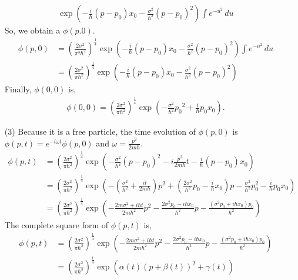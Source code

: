 \documentclass[floatfix,nofootinbib,superscriptaddress,fleqn]{revtex4}
\begin{document}
\begin{itemize}
\begin{align}
    \exp\left( -\frac{i}{\hbar}(p-p_0)x_0-\frac{\sigma^2}{\hbar^2}(p-p_0)^2 \right)
    \int e^{-u^2}\,du
  \end{align}
  So, we obtain a $\phi(p.0)$.
  \begin{align}
    \phi(p,0) &= {\left(\frac{2\sigma^2}{\pi^3\hbar^2}\right)}^{\frac{1}{4}}
    \exp\left( -\frac{i}{\hbar}(p-p_0)x_0-\frac{\sigma^2}{\hbar^2}(p-p_0)^2 \right)
    \int e^{-u^2}\,du \\
    &= {\left(\frac{2\sigma^2}{\pi\hbar^2}\right)}^{\frac{1}{4}}
    \exp\left( -\frac{i}{\hbar}(p-p_0)x_0-\frac{\sigma^2}{\hbar^2}(p-p_0)^2 \right)
  \end{align}
  Finally, $\phi(0,0)$ is,
  \begin{align}
    \phi(0,0) = {\left(\frac{2\sigma^2}{\pi\hbar^2}\right)}^{\frac{1}{4}}
    \exp\left(-\frac{\sigma^2}{\hbar^2}{p_0}^2+\frac{i}{\hbar}p_0x_0\right).
  \end{align}
  \item[(3)]Because it is a free particle, the time evolution of $\phi(p,0)$ is $\phi(p,t)=e^{-i\omega t}\phi(p,0)$ and $\omega = \frac{p^2}{2m\hbar}$.
  \begin{align}
    \phi(p,t) &=  {\left(\frac{2\sigma^2}{\pi\hbar^2}\right)}^{\frac{1}{4}}
    \exp\left( -\frac{\sigma^2}{\hbar^2}(p-p_0)^2-i\frac{p^2}{2m\hbar} t -\frac{i}{\hbar}(p-p_0)x_0 \right) \\
    &= {\left(\frac{2\sigma^2}{\pi\hbar^2}\right)}^{\frac{1}{4}}
    \exp\left( -\left( \frac{\sigma^2}{\hbar^2} +\frac{it}{2m\hbar}  \right)p^2 + \left( \frac{2\sigma^2}{\hbar^2}p_0-\frac{i}{\hbar}x_0  \right)p - \frac{\sigma^2}{\hbar^2}p_0^2-\frac{i}{\hbar}p_0x_0 \right) \\ 
    &= {\left(\frac{2\sigma^2}{\pi\hbar^2}\right)}^{\frac{1}{4}}
    \exp\left( -\frac{2m\sigma^2+i\hbar t}{2m\hbar^2} p^2 -\frac{2\sigma^2p_0-i\hbar x_0}{\hbar^2}  p-\frac{\left(\sigma^2p_0+i\hbar x_0\right)p_0}{\hbar^2} \right)
  \end{align}
  The complete square form of $\phi(p,t)$ is,
  \begin{align}
    \phi(p,t) &= {\left(\frac{2\sigma^2}{\pi\hbar^2}\right)}^{\frac{1}{4}}
    \exp\left( -\frac{2m\sigma^2+i\hbar t}{2m\hbar^2} p^2 -\frac{2\sigma^2p_0-i\hbar x_0}{\hbar^2}  p-\frac{\left(\sigma^2p_0+i\hbar x_0\right)p_0}{\hbar^2} \right) \\
    &= {\left(\frac{2\sigma^2}{\pi\hbar^2}\right)}^{\frac{1}{4}}
    \exp\left(
      \alpha(t)\left(p+\beta(t)\right)^2+\gamma(t)\right)  \\

\end{align}
\end{itemize}
\end{document}
